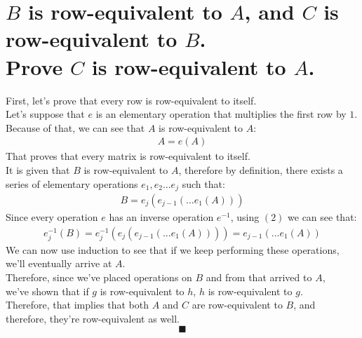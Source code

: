 \documentclass[a4paper, 12pt]{article}
\newcommand{\?}{\stackrel{?}{=}}
\newcommand{\eq}[1]{\begin{align*}#1\end{align*}}
\newcommand{\eqn}[1]{\begin{align}#1\end{align}}
\renewcommand{\qed}{$$\blacksquare$$}
\begin{document}
\section{$B$ is row-equivalent to $A$, and $C$ is row-equivalent to $B$.\\Prove $C$ is row-equivalent to $A$.}
First, let's prove that every row is row-equivalent to itself.\\
Let's suppose that $e$ is an elementary operation that multiplies the first row by $1$.\\
Because of that, we can see that $A$ is row-equivalent to $A$:
\begin{align}
    A = e(A)
\end{align}
That proves that every matrix is row-equivalent to itself.\\
It is given that $B$ is row-equivalent to $A$, therefore by definition,
there exists a series of elementary operations $e_{1},e_{2}...e_{j}$ such that:
\eqn{B = e_{j}(e_{j-1}(...e_{1}(A)))}
Since every operation $e$ has an inverse operation $e^{-1}$, using $(2)$ we can see that:
\eq{e_{j}^{-1}(B) = e_{j}^{-1}(e_{j}(e_{j-1}(...e_{1}(A)))) = e_{j-1}(...e_{1}(A))}
We can now use induction to see that if we keep performing these operations, we'll eventually arrive at $A$.\\
Therefore, since we've placed operations on $B$ and from that arrived to $A$,\\
we've shown that if $g$ is row-equivalent to $h$, $h$ is row-equivalent to $g$.\\
Therefore, that implies that both $A$ and $C$ are row-equivalent to $B$, and therefore, they're row-equivalent as well.
\qed\pagebreak

\end{document}
